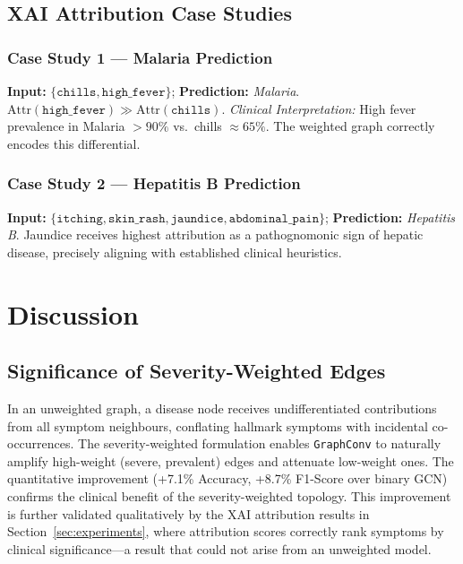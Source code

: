 \documentclass[conference]{IEEEtran}
\begin{document}
\subsection{XAI Attribution Case Studies}

\subsubsection{Case Study 1 --- Malaria Prediction}
\noindent\textbf{Input:} $\{\texttt{chills},\texttt{high\_fever}\}$;
\textbf{Prediction:} \textit{Malaria}.
$\mathrm{Attr}(\texttt{high\_fever})\gg\mathrm{Attr}(\texttt{chills})$.
\textit{Clinical Interpretation:} High fever prevalence in Malaria
$>90\%$ vs.\ chills $\approx65\%$. The weighted graph correctly
encodes this differential.

\subsubsection{Case Study 2 --- Hepatitis B Prediction}
\noindent\textbf{Input:}
$\{\texttt{itching},\texttt{skin\_rash},\texttt{jaundice},
\texttt{abdominal\_pain}\}$;
\textbf{Prediction:} \textit{Hepatitis B}.
Jaundice receives highest attribution as a pathognomonic sign of
hepatic disease, precisely aligning with established clinical
heuristics.

\section{Discussion}
\label{sec:discussion}

\subsection{Significance of Severity-Weighted Edges}

In an unweighted graph, a disease node receives undifferentiated
contributions from all symptom neighbours, conflating hallmark symptoms
with incidental co-occurrences. The severity-weighted formulation
enables \texttt{GraphConv} to naturally amplify high-weight
(severe, prevalent) edges and attenuate low-weight ones. The
quantitative improvement (+7.1\% Accuracy, +8.7\% F1-Score over binary
GCN) confirms the clinical benefit of the severity-weighted topology.
This improvement is further validated qualitatively by the XAI
attribution results in Section~\ref{sec:experiments}, where attribution
scores correctly rank symptoms by clinical significance---a result that
could not arise from an unweighted model.
\end{document}
